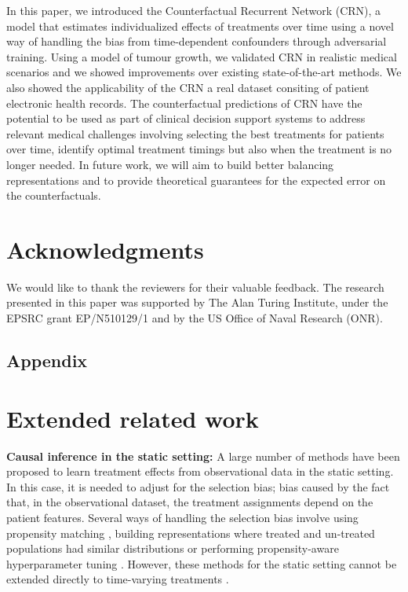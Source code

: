 \documentclass{article} %
\begin{document}
	In this paper, we introduced the Counterfactual Recurrent Network (CRN), a model that estimates individualized effects of treatments over time using a novel way of handling the bias from time-dependent confounders through adversarial training.
	Using a model of tumour growth, we validated CRN in realistic medical scenarios and we showed improvements over existing state-of-the-art methods. We also showed the applicability of the CRN a real dataset consiting of patient electronic health records. The counterfactual predictions of CRN have the potential to be used as part of clinical decision support systems to address relevant medical challenges involving selecting the best treatments for patients over time, identify optimal treatment timings but also when the treatment is no longer needed. In future work, we will aim to build better  balancing representations and to provide theoretical guarantees for the expected error on the counterfactuals. 

\newpage

\section*{Acknowledgments}
We would like to thank the reviewers for their valuable feedback. The research presented in this paper was supported by The Alan Turing Institute, under the EPSRC grant EP/N510129/1 and by the US Office of Naval Research (ONR).






\newpage
\appendix 

\subsection*{Appendix}

\section{Extended related work} \label{apx:related_work}
	
	\textbf{Causal inference in the static setting:} A large number of methods have been proposed to learn treatment effects from observational data in the static setting. In this case, it is needed to adjust for the selection bias; bias caused by the fact that, in the observational dataset, the treatment assignments depend on the patient features. Several ways of handling the selection bias involve using propensity matching \citep{austin2011introduction, imai2014covariate, abadie2016matching}, building representations where treated and un-treated populations had similar distributions \citep{johansson2016learning, shalit2017estimating, li2017matching, yao2018representation} or performing propensity-aware hyperparameter tuning \citep{alaa2017bayesian, alaa2018limits}. However, these methods for the static setting cannot be extended directly to time-varying treatments \citep{hernan2000marginal, schisterman2009overadjustment}.
	
\end{document}
